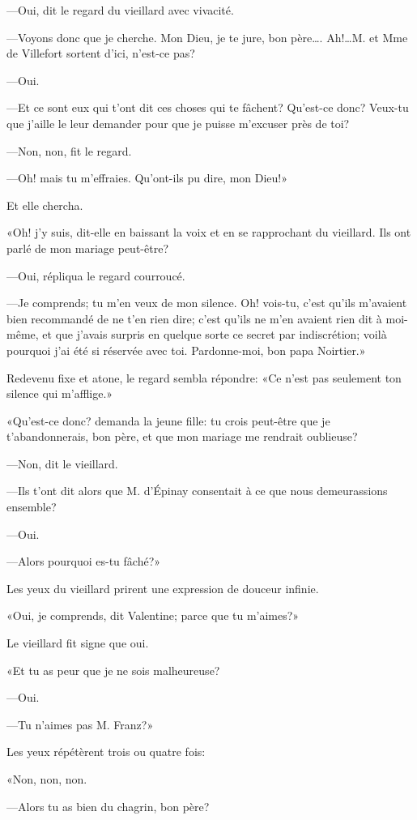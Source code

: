 —Oui, dit le regard du vieillard avec vivacité. 

—Voyons donc que je cherche. Mon Dieu, je te jure, bon père\dots. Ah!\dots M. et Mme de Villefort sortent d'ici, n'est-ce pas? 

—Oui. 

—Et ce sont eux qui t'ont dit ces choses qui te fâchent? Qu'est-ce donc? Veux-tu que j'aille le leur demander pour que je puisse m'excuser près de toi? 

—Non, non, fit le regard. 

—Oh! mais tu m'effraies. Qu'ont-ils pu dire, mon Dieu!» 

Et elle chercha. 

«Oh! j'y suis, dit-elle en baissant la voix et en se rapprochant du vieillard. Ils ont parlé de mon mariage peut-être? 

—Oui, répliqua le regard courroucé. 

—Je comprends; tu m'en veux de mon silence. Oh! vois-tu, c'est qu'ils m'avaient bien recommandé de ne t'en rien dire; c'est qu'ils ne m'en avaient rien dit à moi-même, et que j'avais surpris en quelque sorte ce secret par indiscrétion; voilà pourquoi j'ai été si réservée avec toi. Pardonne-moi, bon papa Noirtier.» 

Redevenu fixe et atone, le regard sembla répondre: «Ce n'est pas seulement ton silence qui m'afflige.» 

«Qu'est-ce donc? demanda la jeune fille: tu crois peut-être que je t'abandonnerais, bon père, et que mon mariage me rendrait oublieuse? 

—Non, dit le vieillard. 

—Ils t'ont dit alors que M. d'Épinay consentait à ce que nous demeurassions ensemble? 

—Oui. 

—Alors pourquoi es-tu fâché?» 

Les yeux du vieillard prirent une expression de douceur infinie. 

«Oui, je comprends, dit Valentine; parce que tu m'aimes?» 

Le vieillard fit signe que oui. 

«Et tu as peur que je ne sois malheureuse? 

—Oui. 

—Tu n'aimes pas M. Franz?» 

Les yeux répétèrent trois ou quatre fois: 

«Non, non, non. 

—Alors tu as bien du chagrin, bon père? 

